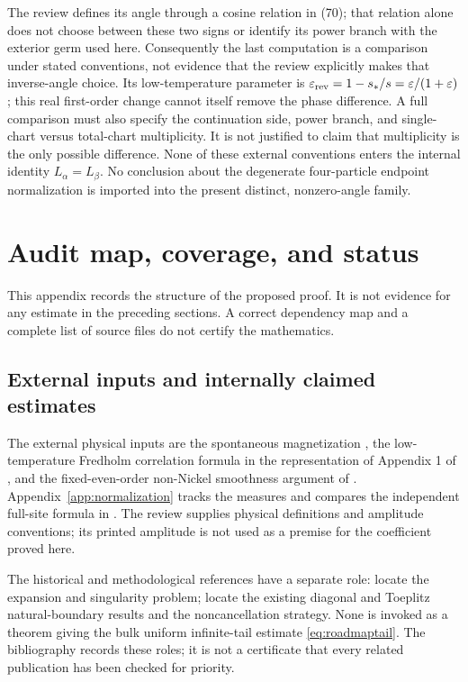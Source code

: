 \documentclass[11pt]{article}
\numberwithin{equation}{section}
\theoremstyle{definition}
\newcommand{\eps}{\varepsilon}
\begin{document}
The review defines its angle through a cosine relation in (70);
that relation alone does not choose between these two signs or
identify its power branch with the exterior germ used here.
Consequently the last computation is a comparison under stated
conventions, not evidence that the review explicitly makes that
inverse-angle choice. Its low-temperature parameter is
\(\eps_{\rm rev}=1-s_*/s=\eps/(1+\eps)\); this real first-order
change cannot itself remove the phase difference. A full comparison
must also specify the continuation side, power branch, and single-chart
versus total-chart multiplicity. It is not justified to claim that
multiplicity is the only possible difference. None of these external
conventions enters the internal identity \(L_\alpha=L_\beta\).
No conclusion about the degenerate four-particle endpoint normalization
is imported into the present distinct, nonzero-angle family.



\section{Audit map, coverage, and status}\label{app:auditmap}
This appendix records the structure of the proposed proof. It is not
evidence for any estimate in the preceding sections. A correct
dependency map and a complete list of source files do not certify
the mathematics.

\subsection{External inputs and internally claimed estimates}
The external physical inputs are the spontaneous magnetization
\cite{Yang1952}, the low-temperature Fredholm correlation formula
\cite{PalmerTracy1981} in the representation of Appendix 1 of
\cite{TW2014}, and the fixed-even-order non-Nickel smoothness
argument of \cite{TW2014}. Appendix~\ref{app:normalization}
tracks the measures and compares the independent full-site formula
in \cite{Boukraa2008}. The review \cite{McCoyMaillard2012}
supplies physical definitions and amplitude conventions; its printed
amplitude is not used as a premise for the coefficient proved here.

The historical and methodological references have a separate role:
\cite{WMTB1976,GuttmannEnting1996,Nickel1999,Nickel2000}
locate the expansion and singularity problem;
\cite{TW2013,TW2017Toeplitz} locate the existing diagonal and
Toeplitz natural-boundary results and the noncancellation strategy.
None is invoked as a theorem giving the bulk uniform infinite-tail
estimate \eqref{eq:roadmaptail}. The bibliography records these
roles; it is not a certificate that every related publication has
been checked for priority.
\end{document}
